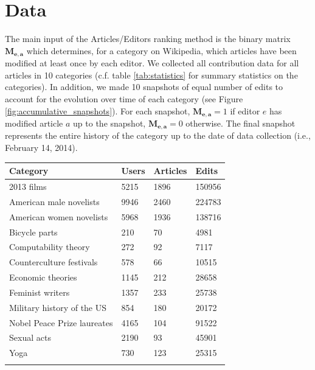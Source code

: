 \section{Data}
The main input of the Articles/Editors ranking method is the binary matrix $\mathbf{M_{e,a}}$ which determines, for a category on Wikipedia, which articles have been modified at least once by each editor. We collected all contribution data for all articles in 10 categories (c.f. table \ref{tab:statistics} for summary statistics on the categories). In addition, we made 10 snapshots of equal number of edits to account for the evolution over time of each category (see Figure \ref{fig:accumulative_snapshots}). For each snapshot, $\mathbf{M_{e,a}} =1$ if editor $e$ has modified article $a$ up to the snapshot, $\mathbf{M_{e,a}} =0$ otherwise. The final snapshot represents the entire history of the category up to the date of data collection (i.e., February 14, 2014).

\begin{tabular}{llll}
\toprule
Category & Users & Articles &  Edits \\
\midrule
2013 films &  5215 &     1896 &  150956 \\
American male novelists &  9946 &     2460 &  224783 \\
American women novelists &  5968 &     1936 &  138716 \\
Bicycle parts &   210 &       70 &    4981 \\
Computability theory &   272 &       92 &    7117 \\
Counterculture festivals &   578 &       66 &   10515 \\
Economic theories &  1145 &      212 &   28658 \\
Feminist writers &  1357 &      233 &   25738 \\
Military history of the US &   854 &      180 &   20172 \\
Nobel Peace Prize laureates &  4165 &      104 &   91522 \\
Sexual acts &  2190 &       93 &   45901 \\
Yoga &   730 &      123 &   25315 \\
\bottomrule
\label{tab:statistics}
\end{tabular}

